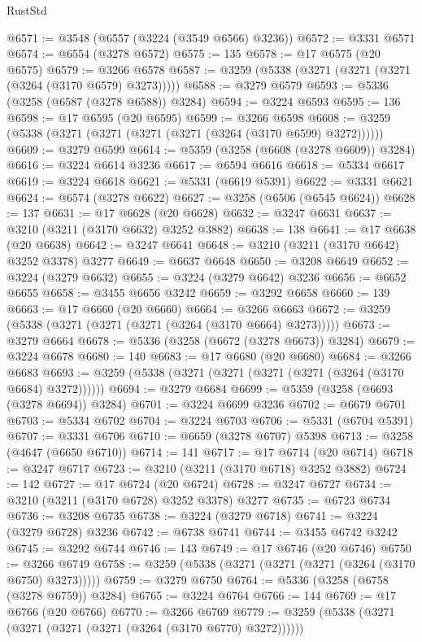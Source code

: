 \begin{lexlean}{RustStd}
\begin{coremodule}
@6571 := @3548 (@6557 (@3224 (@3549 @6566) @3236))
@6572 := @3331 @6571
@6574 := @6554 (@3278 @6572)
@6575 := 135
@6578 := @17 @6575 (@20 @6575)
@6579 := @3266 @6578
@6587 := @3259 (@5338 (@3271 (@3271 (@3271 (@3264 (@3170 @6579) @3273)))))
@6588 := @3279 @6579
@6593 := @5336 (@3258 (@6587 (@3278 @6588)) @3284)
@6594 := @3224 @6593
@6595 := 136
@6598 := @17 @6595 (@20 @6595)
@6599 := @3266 @6598
@6608 := @3259 (@5338 (@3271 (@3271 (@3271 (@3271 (@3264 (@3170 @6599) @3272))))))
@6609 := @3279 @6599
@6614 := @5359 (@3258 (@6608 (@3278 @6609)) @3284)
@6616 := @3224 @6614 @3236
@6617 := @6594 @6616
@6618 := @5334 @6617
@6619 := @3224 @6618
@6621 := @5331 (@6619 @5391)
@6622 := @3331 @6621
@6624 := @6574 (@3278 @6622)
@6627 := @3258 (@6506 (@6545 @6624))
@6628 := 137
@6631 := @17 @6628 (@20 @6628)
@6632 := @3247 @6631
@6637 := @3210 (@3211 (@3170 @6632) @3252 @3882)
@6638 := 138
@6641 := @17 @6638 (@20 @6638)
@6642 := @3247 @6641
@6648 := @3210 (@3211 (@3170 @6642) @3252 @3378) @3277
@6649 := @6637 @6648
@6650 := @3208 @6649
@6652 := @3224 (@3279 @6632)
@6655 := @3224 (@3279 @6642) @3236
@6656 := @6652 @6655
@6658 := @3455 @6656 @3242
@6659 := @3292 @6658
@6660 := 139
@6663 := @17 @6660 (@20 @6660)
@6664 := @3266 @6663
@6672 := @3259 (@5338 (@3271 (@3271 (@3271 (@3264 (@3170 @6664) @3273)))))
@6673 := @3279 @6664
@6678 := @5336 (@3258 (@6672 (@3278 @6673)) @3284)
@6679 := @3224 @6678
@6680 := 140
@6683 := @17 @6680 (@20 @6680)
@6684 := @3266 @6683
@6693 := @3259 (@5338 (@3271 (@3271 (@3271 (@3271 (@3264 (@3170 @6684) @3272))))))
@6694 := @3279 @6684
@6699 := @5359 (@3258 (@6693 (@3278 @6694)) @3284)
@6701 := @3224 @6699 @3236
@6702 := @6679 @6701
@6703 := @5334 @6702
@6704 := @3224 @6703
@6706 := @5331 (@6704 @5391)
@6707 := @3331 @6706
@6710 := @6659 (@3278 @6707) @5398
@6713 := @3258 (@4647 (@6650 @6710))
@6714 := 141
@6717 := @17 @6714 (@20 @6714)
@6718 := @3247 @6717
@6723 := @3210 (@3211 (@3170 @6718) @3252 @3882)
@6724 := 142
@6727 := @17 @6724 (@20 @6724)
@6728 := @3247 @6727
@6734 := @3210 (@3211 (@3170 @6728) @3252 @3378) @3277
@6735 := @6723 @6734
@6736 := @3208 @6735
@6738 := @3224 (@3279 @6718)
@6741 := @3224 (@3279 @6728) @3236
@6742 := @6738 @6741
@6744 := @3455 @6742 @3242
@6745 := @3292 @6744
@6746 := 143
@6749 := @17 @6746 (@20 @6746)
@6750 := @3266 @6749
@6758 := @3259 (@5338 (@3271 (@3271 (@3271 (@3264 (@3170 @6750) @3273)))))
@6759 := @3279 @6750
@6764 := @5336 (@3258 (@6758 (@3278 @6759)) @3284)
@6765 := @3224 @6764
@6766 := 144
@6769 := @17 @6766 (@20 @6766)
@6770 := @3266 @6769
@6779 := @3259 (@5338 (@3271 (@3271 (@3271 (@3271 (@3264 (@3170 @6770) @3272))))))

\end{coremodule}
\end{lexlean}
